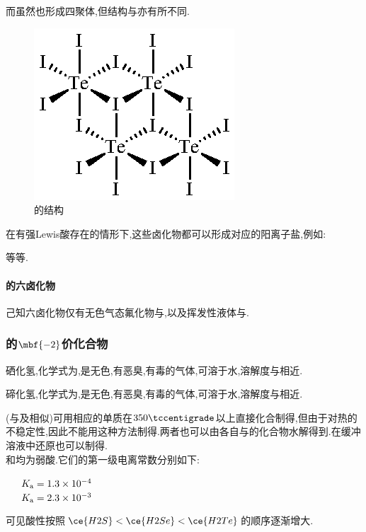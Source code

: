 \documentclass{ctexart}
\begin{document}
而虽然也形成四聚体,但结构与亦有所不同.
\begin{figure}[H]
    \centering\includegraphics{picture/Te4I16.eps}
    \caption{的结构}
\end{figure}
在有强Lewis酸存在的情形下,这些卤化物都可以形成对应的阳离子盐,例如:
\begin{center}
\end{center}
等等.
\paragraph{的六卤化物}
己知六卤化物仅有无色气态氟化物与,以及挥发性液体与.
\subsubsection{的$\mbf{-2}$价化合物}
\begin{substance}[\ce{H2Se}]
    硒化氢,化学式为,是无色,有恶臭,有毒的气体,可溶于水,溶解度与相近.
\end{substance}
\begin{substance}[\ce{H2Te}]
    碲化氢,化学式为,是无色,有恶臭,有毒的气体,可溶于水,溶解度与相近.
\end{substance}
(与及相似)可用相应的单质在$350\tccentigrade$以上直接化合制得,但由于对热的不稳定性,因此不能用这种方法制得.两者也可以由各自与的化合物水解得到.在缓冲溶液中还原也可以制得.\\
\indent {}和均为弱酸.它们的第一级电离常数分别如下:
\begin{center}
    \ \ \ $K_\text a=1.3\times10^{-4}$\\
    \ \ \ $K_\text a=2.3\times10^{-3}$
\end{center}
可见酸性按照$\ce{H2S}<\ce{H2Se}<\ce{H2Te}$的顺序逐渐增大.
\end{document}
